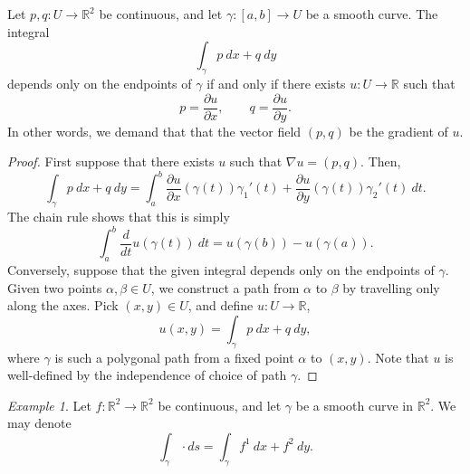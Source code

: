 \documentclass[11pt]{article}
\newcommand{\R}{\mathbb{R}}
\newcommand{\dd}[2]{\frac{d #1}{d #2}}
\newcommand{\pp}[2]{\frac{\partial #1}{\partial #2}}
\newcommand{\grad}{\nabla}
\theoremstyle{definition}
\theoremstyle{remark}
\newtheorem*{example}{Example}
\numberwithin{equation}{section}
\begin{document}
    \begin{theorem}
        Let $p, q\colon U \to \R^2$ be continuous, and let $\gamma \colon [a, b] \to
        U$ be a smooth curve. The integral \[
            \int_\gamma p\:dx + q\:dy
        \] depends only on the endpoints of $\gamma$ if and only if there exists
        $u\colon U \to \R$ such that \[
            p = \pp{u}{x}, \qquad q = \pp{u}{y}.
        \] In other words, we demand that that the vector field $(p, q)$ be the
        gradient of $u$.
    \end{theorem}
    \begin{proof}
        First suppose that there exists $u$ such that $\grad{u} = (p, q)$. Then, \[
            \int_\gamma p\:dx + q\:dy = \int_a^b \pp{u}{x}(\gamma(t))\gamma_1'(t) +
            \pp{u}{y}(\gamma(t))\gamma_2'(t)\:dt.
        \] The chain rule shows that this is simply \[
            \int_a^b \dd{}{t} u(\gamma(t))\:dt = u(\gamma(b)) - u(\gamma(a)).
        \] Conversely, suppose that the given integral depends only on the endpoints
        of $\gamma$. Given two points $\alpha, \beta \in U$, we construct a path
        from $\alpha$ to $\beta$ by travelling only along the axes. Pick $(x, y) \in
        U$, and define $u\colon U \to \R$, \[
            u(x, y) = \int_\gamma p\:dx + q\:dy,
        \] where $\gamma$ is such a polygonal path from a fixed point $\alpha$ to
        $(x, y)$. Note that $u$ is well-defined by the independence of choice of path
        $\gamma$.
    \end{proof}

    \begin{example}
        Let $f\colon \R^2 \to \R^2$ be continuous, and let $\gamma$ be a smooth curve
        in $\R^2$. We may denote \[
            \int_\gamma \cdot ds = \int_\gamma f^1\:dx + f^2\:dy.
        \] 
    \end{example}


    
\end{document}
